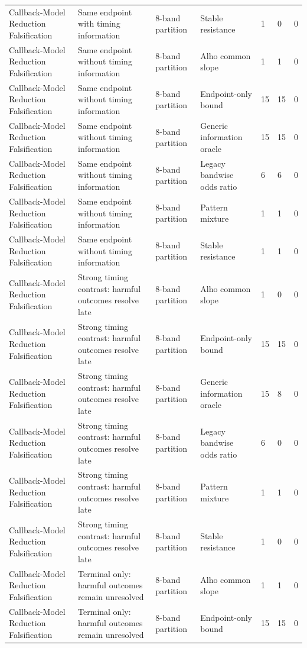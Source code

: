 \begin{tabular}{lllllll}
Callback-Model Reduction Falsification & Same endpoint with timing information & 8-band partition & Stable resistance & 1 & 0 & 0 \\
Callback-Model Reduction Falsification & Same endpoint without timing information & 8-band partition & Alho common slope & 1 & 1 & 0 \\
Callback-Model Reduction Falsification & Same endpoint without timing information & 8-band partition & Endpoint-only bound & 15 & 15 & 0 \\
Callback-Model Reduction Falsification & Same endpoint without timing information & 8-band partition & Generic information oracle & 15 & 15 & 0 \\
Callback-Model Reduction Falsification & Same endpoint without timing information & 8-band partition & Legacy bandwise odds ratio & 6 & 6 & 0 \\
Callback-Model Reduction Falsification & Same endpoint without timing information & 8-band partition & Pattern mixture & 1 & 1 & 0 \\
Callback-Model Reduction Falsification & Same endpoint without timing information & 8-band partition & Stable resistance & 1 & 1 & 0 \\
Callback-Model Reduction Falsification & Strong timing contrast: harmful outcomes resolve late & 8-band partition & Alho common slope & 1 & 0 & 0 \\
Callback-Model Reduction Falsification & Strong timing contrast: harmful outcomes resolve late & 8-band partition & Endpoint-only bound & 15 & 15 & 0 \\
Callback-Model Reduction Falsification & Strong timing contrast: harmful outcomes resolve late & 8-band partition & Generic information oracle & 15 & 8 & 0 \\
Callback-Model Reduction Falsification & Strong timing contrast: harmful outcomes resolve late & 8-band partition & Legacy bandwise odds ratio & 6 & 0 & 0 \\
Callback-Model Reduction Falsification & Strong timing contrast: harmful outcomes resolve late & 8-band partition & Pattern mixture & 1 & 1 & 0 \\
Callback-Model Reduction Falsification & Strong timing contrast: harmful outcomes resolve late & 8-band partition & Stable resistance & 1 & 0 & 0 \\
Callback-Model Reduction Falsification & Terminal only: harmful outcomes remain unresolved & 8-band partition & Alho common slope & 1 & 1 & 0 \\
Callback-Model Reduction Falsification & Terminal only: harmful outcomes remain unresolved & 8-band partition & Endpoint-only bound & 15 & 15 & 0 \\

\end{tabular}
